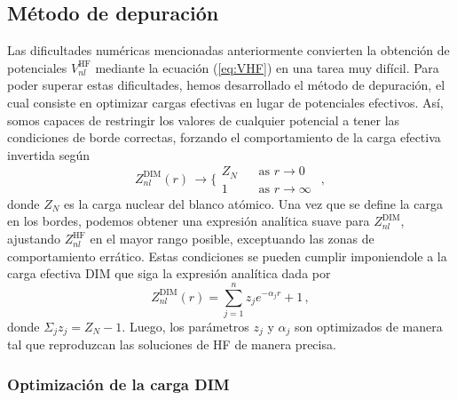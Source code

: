 \newpage
\subsection{Método de depuración}
\label{subsec:depuracion}

Las dificultades numéricas mencionadas anteriormente convierten la 
obtención de potenciales $V_{nl}^{\mathrm{HF}}$ mediante la ecuación 
(\ref{eq:VHF}) en una tarea muy difícil. Para poder superar estas 
dificultades, hemos desarrollado el método de depuración, el cual 
consiste en optimizar cargas efectivas en lugar de potenciales efectivos. 
Así, somos capaces de restringir los valores de cualquier potencial a 
tener las condiciones de borde correctas, forzando el comportamiento de 
la carga efectiva invertida según
\begin{equation}
Z_{nl}^{\mathrm{DIM}}(r) \, \rightarrow 
\bigg\{ 
\begin{array}{ll}
Z_{N}  \ \  & \ \ \text{as\ \ }r  \rightarrow 0\  \\ 
1           & \ \ \text{as\ \ }r  \rightarrow \infty \ 
\end{array}\,,
\label{eq:Zasympt}
\end{equation}
donde $Z_N$ es la carga nuclear del blanco atómico. Una vez que se 
define la carga en los bordes, podemos obtener una expresión analítica
suave para $Z_{nl}^{\mathrm{DIM}}$, ajustando $Z_{nl}^{\mathrm{HF}}$ en
el mayor rango posible, exceptuando las zonas de comportamiento errático.
Estas condiciones se pueden cumplir imponiendole a la carga efectiva 
DIM que siga la expresión analítica dada por
\begin{equation}
Z_{nl}^{\mathrm{DIM}}(r)= \sum_{j=1}^{n} z_j e^{-\alpha_j r}+1 \,,
\label{eq:atomzDIM}
\end{equation}
donde $\Sigma_j z_j=Z_N-1$. Luego, los parámetros $z_j$ y $\alpha_j$ 
son optimizados de manera tal que reproduzcan las soluciones de HF de 
manera precisa.

\subsubsection{Optimización de la carga DIM}
\label{subsec:optDIM}


